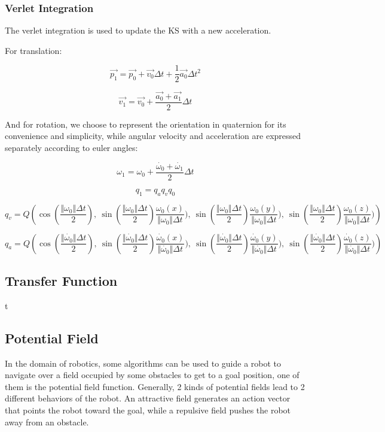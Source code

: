 \subsubsection{Verlet Integration}
The verlet integration is used to update the KS with a new acceleration.

For translation:

\[
\overrightarrow{p_{1}}=\overrightarrow{p_{0}}+\overrightarrow{v_{0}}\Delta t+\frac{1}{2}\overrightarrow{a_{0}}\Delta t^{2}
\]

\[
\overrightarrow{v_{1}}=\overrightarrow{v_{0}}+\frac{\overrightarrow{a_{0}}+\overrightarrow{a_{1}}}{2}\Delta t
\]

And for rotation, we choose to represent the orientation in quaternion for its convenience and simplicity, while angular velocity and acceleration are expressed separately according to euler angles:

\[
\omega_{1}=\omega_{0}+\frac{\dot{\omega_{0}}+\dot{\omega_{1}}}{2}\Delta t
\]

\[
q_{1}=q_{a}q_{v}q_{0}
\]

\[
q_{v}=Q\left(\cos(\frac{\Vert\omega_{0}\Vert\Delta t}{2}),\:\sin(\frac{\Vert\omega_{0}\Vert\Delta t}{2})\frac{\omega_{0}(x)}{\Vert\omega_{0}\Vert\Delta t}),\:\sin(\frac{\Vert\omega_{0}\Vert\Delta t}{2})\frac{\omega_{0}(y)}{\Vert\omega_{0}\Vert\Delta t}),\:\sin(\frac{\Vert\omega_{0}\Vert\Delta t}{2})\frac{\omega_{0}(z)}{\Vert\omega_{0}\Vert\Delta t})\right)
\]

\[
q_{a}=Q\left(\cos(\frac{\Vert\dot{\omega_{0}}\Vert\Delta t}{2}),\:\sin(\frac{\Vert\dot{\omega_{0}}\Vert\Delta t}{2})\frac{\dot{\omega_{0}}(x)}{\Vert\dot{\omega_{0}}\Vert\Delta t}),\:\sin(\frac{\Vert\dot{\omega_{0}}\Vert\Delta t}{2})\frac{\dot{\omega_{0}}(y)}{\Vert\dot{\omega_{0}}\Vert\Delta t}),\:\sin(\frac{\Vert\dot{\omega_{0}}\Vert\Delta t}{2})\frac{\dot{\omega_{0}}(z)}{\Vert\dot{\omega_{0}}\Vert\Delta t})\right)
\]

\subsection{Transfer Function}
t
\subsection{Potential Field}
In the domain of robotics, some algorithms can be used to guide a robot to navigate over a field occupied by some obstacles to get to a goal position, one of them is the potential field function. Generally, 2 kinds of potential fields lead to 2 different behaviors of the robot. An attractive field generates an action vector that points the robot toward the goal, while a repulsive field pushes the robot away from an obstacle.

